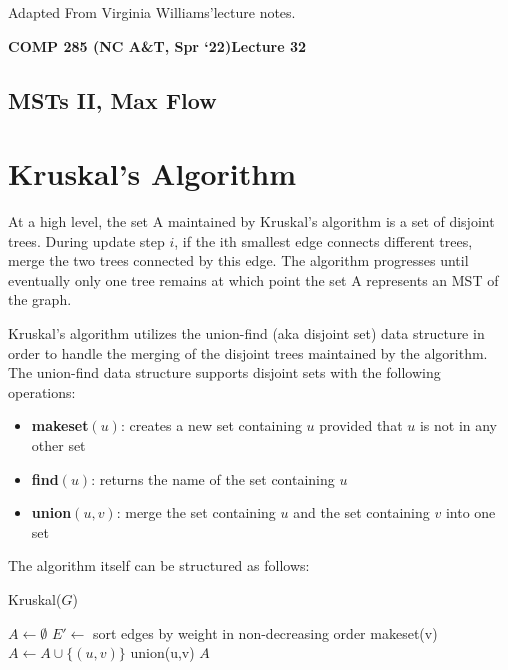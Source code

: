 \documentclass [12pt]{article}
\theoremstyle{definition}
\begin{document}
 

\vspace {1em} 
\begin {Instruction} 
Adapted From Virginia Williams'lecture notes.
\end {Instruction}  

{\LARGE \textbf {COMP 285 (NC A\&T, Spr `22)}\hfill \textbf {Lecture 32} } 

\begin{centering}
\section*{MSTs II, Max Flow}
\end{centering}

\section{Kruskal's Algorithm} 

At a high level, the set A maintained by Kruskal's algorithm is a set of disjoint trees. During update step $i$, if the ith smallest edge connects different trees, merge the two trees connected by this edge. The algorithm progresses until eventually only one tree remains at which point the set A represents an MST of the graph.

Kruskal's algorithm utilizes the union-find (aka disjoint set) data structure in order to handle the merging of the disjoint trees maintained by the algorithm. The union-find data structure supports disjoint sets with the following operations:

\begin{itemize}
\item \textbf{makeset}$(u)$: creates a new set containing $u$ provided that $u$ is not in any other set
\item \textbf{find}$(u)$: returns the name of the set containing $u$
\item \textbf{union}$(u, v )$: merge the set containing $u$ and the set containing $v$ into one set
\end{itemize}

The algorithm itself can be structured as follows:

\begin{algorithm}
\caption{Kruskal($G$)}
\label{alg:kruskal_algorithm}
\begin{algorithmic}
\State $A \gets \emptyset$
\State $E' \gets$ sort edges by weight in non-decreasing order
\State {} {
    \State makeset(v)
}
\State {} {
     {
        \State $A \gets A \cup \{(u,v)\}$
        \State union(u,v)
    }
}
\State \Return $A$
\end{algorithmic}
\end{algorithm}
\end{document}
